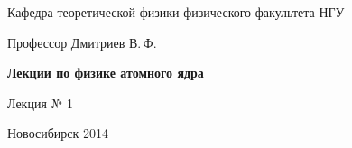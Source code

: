 \documentclass[12pt,pagesize,paper=192mm:108mm]{scrbook}
\begin{document}
\begin{titlepage}
\begin{center}
    Кафедра теоретической физики физического факультета НГУ
    \medskip

    \Large
    Профессор Дмитриев В.\,Ф.
    \bigskip

    \huge
    \textbf{Лекции по физике атомного ядра}
    \bigskip

    \Large
    Лекция № 1
    \vfill

    \normalsize
    \vfill

    \normalsize \ccbysa\hspace{0.5em}  Новосибирск 2014
  \end{center}
\end{titlepage}
\end{document}
